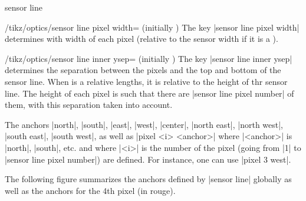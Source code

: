\documentclass[a4paper]{ltxdoc}
\begin{document}
\begin{shape}{sensor line}
\begin{key}{/tikz/optics/sensor line pixel width= (initially )}
    The key |sensor line pixel width| determines with width of each pixel (relative to the sensor width if it is a ).

    \begin{codeexample}[]
    \end{codeexample}
\end{key}


\begin{key}{/tikz/optics/sensor line inner ysep= (initially )}
    The key |sensor line inner ysep| determines the separation between the pixels and the top and bottom of the sensor line.
    When  is a relative lengths, it is relative to the height of thr sensor line.
    The height of each pixel is such that there are |sensor line pixel number| of them, with this separation taken into account.

    \begin{codeexample}[]
    \end{codeexample}
\end{key}


The anchors |north|, |south|, |east|, |west|, |center|, |north east|, |north west|, |south east|, |south west|, as well as
|pixel <i> <anchor>| where |<anchor>| is |north|, |south|, etc. and where |<i>| is the number of the pixel
(going from |1| to |sensor line pixel number|) are defined. For instance, one can use |pixel 3 west|.

The following figure summarizes the anchors defined by |sensor line| globally as well as the anchors for the 4th pixel (in rouge).

\begin{codeexample}[]
\Huge
{}
\end{codeexample}
\end{shape}
\end{document}
